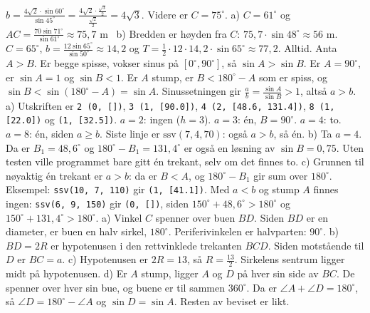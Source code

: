  $b = \frac{4\sqrt2 \cdot \sin 60^\circ}{\sin 45^\circ} = \frac{4\sqrt2 \cdot \frac{\sqrt3}{2}}{\frac{\sqrt2}{2}} = 4\sqrt3$. Videre er $C = 75^\circ$.
 a) $C = 61^\circ$ og $AC = \frac{70\sin 71^\circ}{\sin 61^\circ} \approx 75,7$ m \ b) Bredden er høyden fra $C$: $75,7 \cdot \sin 48^\circ \approx 56$ m.
 $C = 65^\circ$, $b = \frac{12 \sin 65^\circ}{\sin 50^\circ} \approx 14,2$ og $T = \frac12 \cdot 12 \cdot 14,2 \cdot \sin 65^\circ \approx 77,2$.
 Alltid. Anta $A > B$. Er begge spisse, vokser sinus på $[0^\circ, 90^\circ]$, så $\sin A > \sin B$. Er $A = 90^\circ$, er $\sin A = 1$ og $\sin B < 1$. Er $A$ stump, er $B < 180^\circ - A$ som er spiss, og $\sin B < \sin(180^\circ - A) = \sin A$. Sinussetningen gir $\frac ab = \frac{\sin A}{\sin B} > 1$, altså $a > b$.
 a) Utskriften er
\lstinline[style=laereverk,numbers=none,frame=none]|2 (0, [])|,
\lstinline[style=laereverk,numbers=none,frame=none]|3 (1, [90.0])|,
\lstinline[style=laereverk,numbers=none,frame=none]|4 (2, [48.6, 131.4])|,
\lstinline[style=laereverk,numbers=none,frame=none]|8 (1, [22.0])| og
\lstinline[style=laereverk,numbers=none,frame=none]|(1, [32.5])|.
$a = 2$: ingen ($h = 3$). $a = 3$: én, $B = 90^\circ$. $a = 4$: to. $a = 8$: én, siden $a \ge b$. Siste linje er $\mathrm{ssv}(7, 4, 70)$: også $a > b$, så én.
b) Ta $a = 4$. Da er $B_1 = 48,6^\circ$ og $180^\circ - B_1 = 131,4^\circ$ er også en løsning av $\sin B = 0,75$. Uten testen ville programmet bare gitt én trekant, selv om det finnes to.
c) Grunnen til nøyaktig én trekant er $a > b$: da er $B < A$, og $180^\circ - B_1$ gir sum over $180^\circ$. Eksempel: \lstinline[style=laereverk,numbers=none,frame=none]|ssv(10, 7, 110)| gir \lstinline[style=laereverk,numbers=none,frame=none]|(1, [41.1])|. Med $a < b$ og stump $A$ finnes ingen: \lstinline[style=laereverk,numbers=none,frame=none]|ssv(6, 9, 150)| gir \lstinline[style=laereverk,numbers=none,frame=none]|(0, [])|, siden $150^\circ + 48,6^\circ > 180^\circ$ og $150^\circ + 131,4^\circ > 180^\circ$.
 a) Vinkel $C$ spenner over buen $BD$. Siden $BD$ er en diameter, er buen en halv sirkel, $180^\circ$. Periferivinkelen er halvparten: $90^\circ$.
b) $BD = 2R$ er hypotenusen i den rettvinklede trekanten $BCD$. Siden motstående til $D$ er $BC = a$.
c) Hypotenusen er $2R = 13$, så $R = \frac{13}{2}$. Sirkelens sentrum ligger midt på hypotenusen.
d) Er $A$ stump, ligger $A$ og $D$ på hver sin side av $BC$. De spenner over hver sin bue, og buene er til sammen $360^\circ$. Da er $\angle A + \angle D = 180^\circ$, så $\angle D = 180^\circ - \angle A$ og $\sin D = \sin A$. Resten av beviset er likt.
